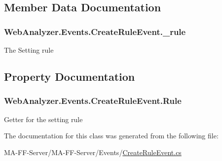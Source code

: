 \subsection{Member Data Documentation}
\hypertarget{class_web_analyzer_1_1_events_1_1_create_rule_event_aa7ea8115af74d881c10cc99d44652340}{}
\subsubsection[{\+\_\+rule}]{ Web\+Analyzer.\+Events.\+Create\+Rule\+Event.\+\_\+rule\hspace{0.3cm}{\ttfamily [private]}}\label{class_web_analyzer_1_1_events_1_1_create_rule_event_aa7ea8115af74d881c10cc99d44652340}


The Setting rule 



\subsection{Property Documentation}
\hypertarget{class_web_analyzer_1_1_events_1_1_create_rule_event_a71f6a5e08aac9efa2b7da9052f8890e3}{}
\subsubsection[{Rule}]{ Web\+Analyzer.\+Events.\+Create\+Rule\+Event.\+Rule\hspace{0.3cm}{\ttfamily [get]}}\label{class_web_analyzer_1_1_events_1_1_create_rule_event_a71f6a5e08aac9efa2b7da9052f8890e3}


Getter for the setting rule 



The documentation for this class was generated from the following file\+:\begin{DoxyCompactItemize}
\item 
M\+A-\/\+F\+F-\/\+Server/\+M\+A-\/\+F\+F-\/\+Server/\+Events/\hyperlink{_create_rule_event_8cs}{Create\+Rule\+Event.\+cs}\end{DoxyCompactItemize}

